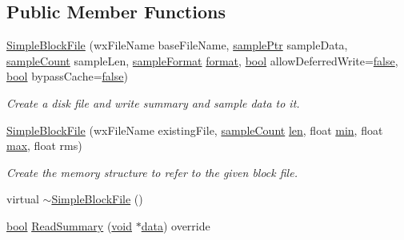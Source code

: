 \subsection*{Public Member Functions}
\begin{DoxyCompactItemize}
\item 
\hyperlink{class_simple_block_file_a10f32728f1bed4cfeca2c2fde88d3395}{Simple\+Block\+File} (wx\+File\+Name base\+File\+Name, \hyperlink{include_2audacity_2_types_8h_aaafb46d1caf7c79262fec96b577215fe}{sample\+Ptr} sample\+Data, \hyperlink{include_2audacity_2_types_8h_afa427e1f521ea5ec12d054e8bd4d0f71}{sample\+Count} sample\+Len, \hyperlink{include_2audacity_2_types_8h_a9938d2e2f6adef23e745cd80ef379792}{sample\+Format} \hyperlink{_export_p_c_m_8cpp_a317afff57d87a89158c2b038d37b2b08}{format}, \hyperlink{mac_2config_2i386_2lib-src_2libsoxr_2soxr-config_8h_abb452686968e48b67397da5f97445f5b}{bool} allow\+Deferred\+Write=\hyperlink{mac_2config_2i386_2lib-src_2libsoxr_2soxr-config_8h_a65e9886d74aaee76545e83dd09011727}{false}, \hyperlink{mac_2config_2i386_2lib-src_2libsoxr_2soxr-config_8h_abb452686968e48b67397da5f97445f5b}{bool} bypass\+Cache=\hyperlink{mac_2config_2i386_2lib-src_2libsoxr_2soxr-config_8h_a65e9886d74aaee76545e83dd09011727}{false})
\begin{DoxyCompactList}\small\item\em Create a disk file and write summary and sample data to it. \end{DoxyCompactList}\item 
\hyperlink{class_simple_block_file_ac61d2c610ba38629c4e32d12350af339}{Simple\+Block\+File} (wx\+File\+Name existing\+File, \hyperlink{include_2audacity_2_types_8h_afa427e1f521ea5ec12d054e8bd4d0f71}{sample\+Count} \hyperlink{lib_2expat_8h_af86d325fecfc8f47b61fbf5a5146f582}{len}, float \hyperlink{_compare_audio_command_8cpp_abd8bbcfabb3ddef2ccaafb9928a37b95}{min}, float \hyperlink{_t_d_stretch_8cpp_ac39d9cef6a5e030ba8d9e11121054268}{max}, float rms)
\begin{DoxyCompactList}\small\item\em Create the memory structure to refer to the given block file. \end{DoxyCompactList}\item 
virtual \hyperlink{class_simple_block_file_a31f9eb32ce25d44c16414851e527e32c}{$\sim$\+Simple\+Block\+File} ()
\item 
\hyperlink{mac_2config_2i386_2lib-src_2libsoxr_2soxr-config_8h_abb452686968e48b67397da5f97445f5b}{bool} \hyperlink{class_simple_block_file_addcddf2634ca5ec580fa69d0d603d6d0}{Read\+Summary} (\hyperlink{sound_8c_ae35f5844602719cf66324f4de2a658b3}{void} $\ast$\hyperlink{lib_2expat_8h_ac39e72a1de1cb50dbdc54b08d0432a24}{data}) override

\end{DoxyCompactItemize}

